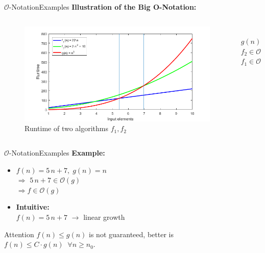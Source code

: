 \begin{frame}{$\mathcal{O}$-Notation}{Examples}
  \textbf{Illustration of the Big O-Notation:}\\[-1.0em]
  \begin{columns}
    \begin{column}{0.9\textwidth}
      \begin{figure}[!h]
        \includegraphics[width=\linewidth]{Images/BigONotationRuntime.png}
        \caption{Runtime of two algorithms $f_1, f_2$}
        \label{fig:big_o_runtime_example}
      \end{figure}
    \end{column}
    \begin{column}{0.1\textwidth}
      \vspace{-4.75em}\\
      \hspace*{-2.5em}$g(n)$\\[2.0em]
      \hspace*{-2.5em}$f_2 \in \mathcal{O}(g)$\\[2.5em]
      \hspace*{-2.5em}$f_1 \in \mathcal{O}(g)$
    \end{column}
  \end{columns}
\end{frame}


\begin{frame}{$\mathcal{O}$-Notation}{Examples}
  \textbf{Example:}
  \begin{itemize}
    \item
      $f(n) = 5 \, n + 7, \; g(n) = n$\\
      $\Rightarrow$ $5 \, n + 7 \in \mathcal{O}(g)$\\
      $\Rightarrow f \in \mathcal{O}(g)$
     \item
      \textbf{Intuitive:}\\
      $f(n) = 5 \, n + 7$ $\rightarrow$ linear growth
  \end{itemize}
  \begin{alertblock}{Attention}
    $f(n) \leq g(n)$ is not guaranteed, better is
    $f(n) \leq C \cdot g(n) \;\; \forall n \geq n_0$.
  \end{alertblock}
\end{frame}

